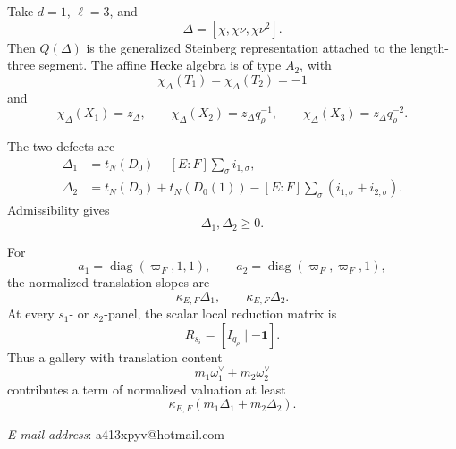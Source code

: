 \documentclass[12pt]{article}
\theoremstyle{definition}
\theoremstyle{remark}
\begin{document}
Take \(d=1\), \(\ell=3\), and
\[
 \Delta=[\chi,\chi\nu,\chi\nu^2].
\]
Then \(Q(\Delta)\) is the generalized Steinberg representation attached to
the length-three segment.  The affine Hecke algebra is of type \(A_2\), with
\[
 \chi_\Delta(T_1)=\chi_\Delta(T_2)=-1
\]
and
\[
 \chi_\Delta(X_1)=z_\Delta,
 \qquad
 \chi_\Delta(X_2)=z_\Delta q_\rho^{-1},
 \qquad
 \chi_\Delta(X_3)=z_\Delta q_\rho^{-2}.
\]

The two defects are
\begin{align}
 \Delta_1
 &=
 t_N(D_0)
 -
 [E:F]\sum_\sigma i_{1,\sigma},
 \label{eq:n3-one-segment-Delta1}\\
 \Delta_2
 &=
 t_N(D_0)+t_N(D_0(1))
 -
 [E:F]\sum_\sigma
 (i_{1,\sigma}+i_{2,\sigma}).
 \label{eq:n3-one-segment-Delta2}
\end{align}
Admissibility gives
\[
 \Delta_1,\Delta_2\geq0.
\]

For
\[
 a_1=\operatorname{diag}(\varpi_F,1,1),
 \qquad
 a_2=\operatorname{diag}(\varpi_F,\varpi_F,1),
\]
the normalized translation slopes are
\[
 \kappa_{E,F}\Delta_1,
 \qquad
 \kappa_{E,F}\Delta_2.
\]
At every \(s_1\)- or \(s_2\)-panel, the scalar local reduction matrix is
\[
 R_{s_i}=[I_{q_\rho}\mid-\mathbf 1].
\]
Thus a gallery with translation content
\[
 m_1\omega_1^\vee+m_2\omega_2^\vee
\]
contributes a term of normalized valuation at least
\begin{equation}\label{eq:n3-one-segment-gallery-valuation}
 \kappa_{E,F}
 (m_1\Delta_1+m_2\Delta_2).
\end{equation}






\medskip
\noindent\textit{E-mail address}: a413xpyv@hotmail.com
\end{document}
